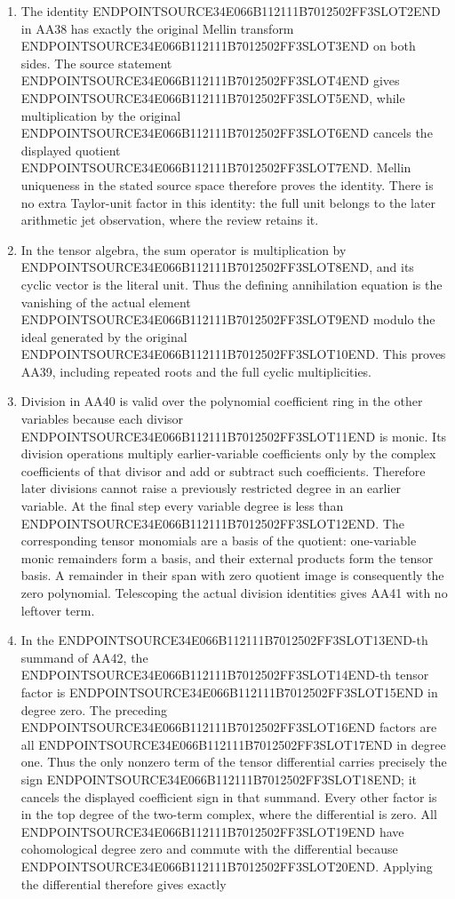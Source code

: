 \begin{enumerate}
\def\labelenumi{\arabic{enumi}.}
\item
  The identity ENDPOINTSOURCE34E066B112111B7012502FF3SLOT2END in AA38 has exactly the original Mellin transform ENDPOINTSOURCE34E066B112111B7012502FF3SLOT3END on both sides. The source statement ENDPOINTSOURCE34E066B112111B7012502FF3SLOT4END gives ENDPOINTSOURCE34E066B112111B7012502FF3SLOT5END, while multiplication by the original ENDPOINTSOURCE34E066B112111B7012502FF3SLOT6END cancels the displayed quotient ENDPOINTSOURCE34E066B112111B7012502FF3SLOT7END. Mellin uniqueness in the stated source space therefore proves the identity. There is no extra Taylor-unit factor in this identity: the full unit belongs to the later arithmetic jet observation, where the review retains it.
\item
  In the tensor algebra, the sum operator is multiplication by ENDPOINTSOURCE34E066B112111B7012502FF3SLOT8END, and its cyclic vector is the literal unit. Thus the defining annihilation equation is the vanishing of the actual element ENDPOINTSOURCE34E066B112111B7012502FF3SLOT9END modulo the ideal generated by the original ENDPOINTSOURCE34E066B112111B7012502FF3SLOT10END. This proves AA39, including repeated roots and the full cyclic multiplicities.
\item
  Division in AA40 is valid over the polynomial coefficient ring in the other variables because each divisor ENDPOINTSOURCE34E066B112111B7012502FF3SLOT11END is monic. Its division operations multiply earlier-variable coefficients only by the complex coefficients of that divisor and add or subtract such coefficients. Therefore later divisions cannot raise a previously restricted degree in an earlier variable. At the final step every variable degree is less than ENDPOINTSOURCE34E066B112111B7012502FF3SLOT12END. The corresponding tensor monomials are a basis of the quotient: one-variable monic remainders form a basis, and their external products form the tensor basis. A remainder in their span with zero quotient image is consequently the zero polynomial. Telescoping the actual division identities gives AA41 with no leftover term.
\item
  In the ENDPOINTSOURCE34E066B112111B7012502FF3SLOT13END-th summand of AA42, the ENDPOINTSOURCE34E066B112111B7012502FF3SLOT14END-th tensor factor is ENDPOINTSOURCE34E066B112111B7012502FF3SLOT15END in degree zero. The preceding ENDPOINTSOURCE34E066B112111B7012502FF3SLOT16END factors are all ENDPOINTSOURCE34E066B112111B7012502FF3SLOT17END in degree one. Thus the only nonzero term of the tensor differential carries precisely the sign ENDPOINTSOURCE34E066B112111B7012502FF3SLOT18END; it cancels the displayed coefficient sign in that summand. Every other factor is in the top degree of the two-term complex, where the differential is zero. All ENDPOINTSOURCE34E066B112111B7012502FF3SLOT19END have cohomological degree zero and commute with the differential because ENDPOINTSOURCE34E066B112111B7012502FF3SLOT20END. Applying the differential therefore gives exactly


\end{enumerate}
